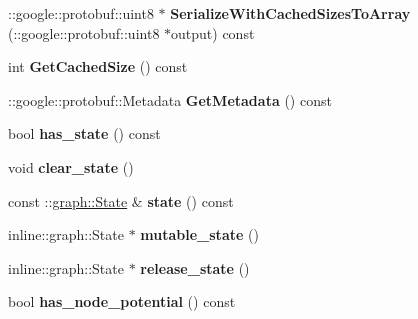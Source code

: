 \begin{DoxyCompactItemize}
\item 
\hypertarget{classgraph_1_1NodeStatePotential_a6ec1fd079d7e4ba59d85aadb77b153a5}{
::google::protobuf::uint8 $\ast$ {\bfseries SerializeWithCachedSizesToArray} (::google::protobuf::uint8 $\ast$output) const }
\label{classgraph_1_1NodeStatePotential_a6ec1fd079d7e4ba59d85aadb77b153a5}

\item 
\hypertarget{classgraph_1_1NodeStatePotential_aed31dd680aeefcc638f69aed20feaa89}{
int {\bfseries GetCachedSize} () const }
\label{classgraph_1_1NodeStatePotential_aed31dd680aeefcc638f69aed20feaa89}

\item 
\hypertarget{classgraph_1_1NodeStatePotential_a9d32e1f4f52612fb611c3cca90461266}{
::google::protobuf::Metadata {\bfseries GetMetadata} () const }
\label{classgraph_1_1NodeStatePotential_a9d32e1f4f52612fb611c3cca90461266}

\item 
\hypertarget{classgraph_1_1NodeStatePotential_a360c4a144fbf3d177d98617b5b680917}{
bool {\bfseries has\_\-state} () const }
\label{classgraph_1_1NodeStatePotential_a360c4a144fbf3d177d98617b5b680917}

\item 
\hypertarget{classgraph_1_1NodeStatePotential_aa742b7c0f5560b3ef8d9a611681cf73f}{
void {\bfseries clear\_\-state} ()}
\label{classgraph_1_1NodeStatePotential_aa742b7c0f5560b3ef8d9a611681cf73f}

\item 
\hypertarget{classgraph_1_1NodeStatePotential_ac914f8afa03faa9de6db823c5f21b7cc}{
const ::\hyperlink{classgraph_1_1State}{graph::State} \& {\bfseries state} () const }
\label{classgraph_1_1NodeStatePotential_ac914f8afa03faa9de6db823c5f21b7cc}

\item 
\hypertarget{classgraph_1_1NodeStatePotential_a8f877868f7590b5be5aae6a78279a75f}{
inline::graph::State $\ast$ {\bfseries mutable\_\-state} ()}
\label{classgraph_1_1NodeStatePotential_a8f877868f7590b5be5aae6a78279a75f}

\item 
\hypertarget{classgraph_1_1NodeStatePotential_a81e5e07ae88c654ef848a8ddfbec8148}{
inline::graph::State $\ast$ {\bfseries release\_\-state} ()}
\label{classgraph_1_1NodeStatePotential_a81e5e07ae88c654ef848a8ddfbec8148}

\item 
\hypertarget{classgraph_1_1NodeStatePotential_a2ef72c30a1c13aa21170eef7a43bde34}{
bool {\bfseries has\_\-node\_\-potential} () const }
\label{classgraph_1_1NodeStatePotential_a2ef72c30a1c13aa21170eef7a43bde34}


\end{DoxyCompactItemize}
